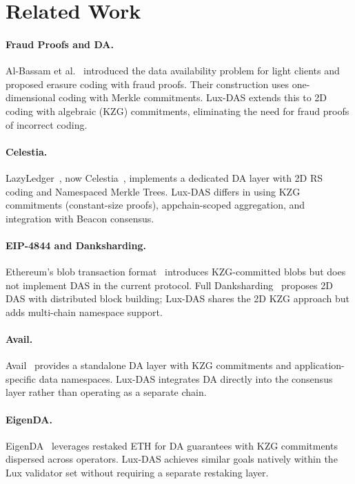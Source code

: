 \section{Related Work}

\label{sec:related}

\paragraph{Fraud Proofs and DA.}
Al-Bassam et al.~\cite{albassam2018fraud} introduced the data availability problem for
light clients and proposed erasure coding with fraud proofs. Their construction uses
one-dimensional coding with Merkle commitments. Lux-DAS extends this to 2D coding with
algebraic (KZG) commitments, eliminating the need for fraud proofs of incorrect coding.

\paragraph{Celestia.}
LazyLedger~\cite{albassam2019lazyledger}, now Celestia~\cite{celestia2023}, implements
a dedicated DA layer with 2D RS coding and Namespaced Merkle Trees. Lux-DAS differs in
using KZG commitments (constant-size proofs), appchain-scoped aggregation, and integration
with Beacon consensus.

\paragraph{EIP-4844 and Danksharding.}
Ethereum's blob transaction format~\cite{eip4844} introduces KZG-committed blobs but does
not implement DAS in the current protocol. Full Danksharding~\cite{dankrad2022danksharding}
proposes 2D DAS with distributed block building; Lux-DAS shares the 2D KZG approach but
adds multi-chain namespace support.

\paragraph{Avail.}
Avail~\cite{avail2023} provides a standalone DA layer with KZG commitments and application-
specific data namespaces. Lux-DAS integrates DA directly into the consensus layer rather
than operating as a separate chain.

\paragraph{EigenDA.}
EigenDA~\cite{eigenda2023} leverages restaked ETH for DA guarantees with KZG commitments
dispersed across operators. Lux-DAS achieves similar goals natively within the Lux validator
set without requiring a separate restaking layer.

